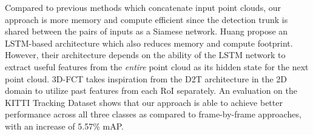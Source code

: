 \documentclass[10pt,twocolumn,letterpaper]{article}
\begin{document}
Compared to previous methods which concatenate input point clouds, our approach is more memory and compute efficient since the detection trunk is shared between the pairs of inputs as a Siamese network. Huang \etal\cite{Huang2020a} propose an LSTM-based architecture which also reduces memory and compute footprint. However, their architecture depends on the ability of the LSTM network to extract useful features from the {\em entire} point cloud as its hidden state for the next point cloud. 3D-FCT takes inspiration from the D2T architecture \cite{Feichtenhofer2017} in the 2D domain to utilize past features from each RoI separately.  An evaluation on the KITTI \cite{Geiger2013IJRR} Tracking Dataset shows that our approach is able to achieve better performance across all three classes as compared to frame-by-frame approaches, with an increase of 5.57\% mAP.
\end{document}
